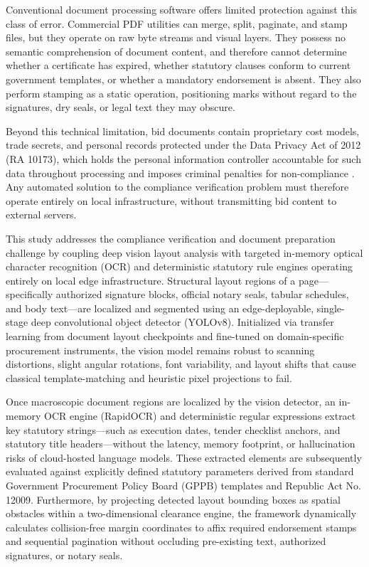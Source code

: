 Conventional document processing software offers limited protection against this class of error.
Commercial PDF utilities can merge, split, paginate, and stamp files, but they operate on raw byte streams and visual layers.
They possess no semantic comprehension of document content, and therefore cannot determine whether a certificate has expired, whether statutory clauses conform to current government templates, or whether a mandatory endorsement is absent.
They also perform stamping as a static operation, positioning marks without regard to the signatures, dry seals, or legal text they may obscure.

Beyond this technical limitation, bid documents contain proprietary cost models, trade secrets, and personal records protected under the Data Privacy Act of 2012 (RA 10173), which holds the personal information controller accountable for such data throughout processing and imposes criminal penalties for non-compliance \cite{ref6}.
Any automated solution to the compliance verification problem must therefore operate entirely on local infrastructure, without transmitting bid content to external servers.

This study addresses the compliance verification and document preparation challenge by coupling deep vision layout analysis with targeted in-memory optical character recognition (OCR) and deterministic statutory rule engines operating entirely on local edge infrastructure.
Structural layout regions of a page—specifically authorized signature blocks, official notary seals, tabular schedules, and body text—are localized and segmented using an edge-deployable, single-stage deep convolutional object detector (YOLOv8).
Initialized via transfer learning from document layout checkpoints and fine-tuned on domain-specific procurement instruments, the vision model remains robust to scanning distortions, slight angular rotations, font variability, and layout shifts that cause classical template-matching and heuristic pixel projections to fail.

Once macroscopic document regions are localized by the vision detector, an in-memory OCR engine (RapidOCR) and deterministic regular expressions extract key statutory strings—such as execution dates, tender checklist anchors, and statutory title headers—without the latency, memory footprint, or hallucination risks of cloud-hosted language models.
These extracted elements are subsequently evaluated against explicitly defined statutory parameters derived from standard Government Procurement Policy Board (GPPB) templates and Republic Act No. 12009.
Furthermore, by projecting detected layout bounding boxes as spatial obstacles within a two-dimensional clearance engine, the framework dynamically calculates collision-free margin coordinates to affix required endorsement stamps and sequential pagination without occluding pre-existing text, authorized signatures, or notary seals.

